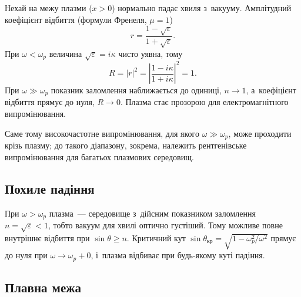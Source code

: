 Нехай на межу плазми ($x>0$) нормально падає хвиля з~вакууму. Амплітудний коефіцієнт
відбиття (формули Френеля, $\mu=1$)
\begin{equation*}
	r=\frac{1-\sqrt\varepsilon}{1+\sqrt\varepsilon}.
\end{equation*}
При $\omega<\omega_p$ величина $\sqrt\varepsilon=i\kappa$ чисто уявна, тому
\begin{equation*}
	R=|r|^2=\left|\frac{1-i\kappa}{1+i\kappa}\right|^2=1.
\end{equation*}
При $\omega\gg\omega_p$ показник заломлення наближається до одиниці, $n\to1$, а~коефіцієнт
відбиття прямує до нуля, $R\to0$. Плазма стає прозорою для електромагнітного
випромінювання.

Саме тому високочастотне випромінювання, для якого $\omega\gg\omega_p$, може проходити
крізь плазму; до такого діапазону, зокрема, належить рентгенівське випромінювання для
багатьох плазмових середовищ.



\subsection{Похиле падіння}



При $\omega>\omega_p$ плазма~--- середовище з~дійсним показником заломлення
$n=\sqrt\varepsilon<1$, тобто вакуум для хвилі оптично густіший. Тому можливе повне
внутрішнє відбиття при $\sin\theta\geq n$. Критичний кут
$\sin\theta_{\mathrm{кр}}=\sqrt{1-\omega_p^2/\omega^2}$ прямує до нуля при
$\omega\to\omega_p+0$, і~плазма відбиває при будь-якому куті падіння.



\subsection{Плавна межа}



